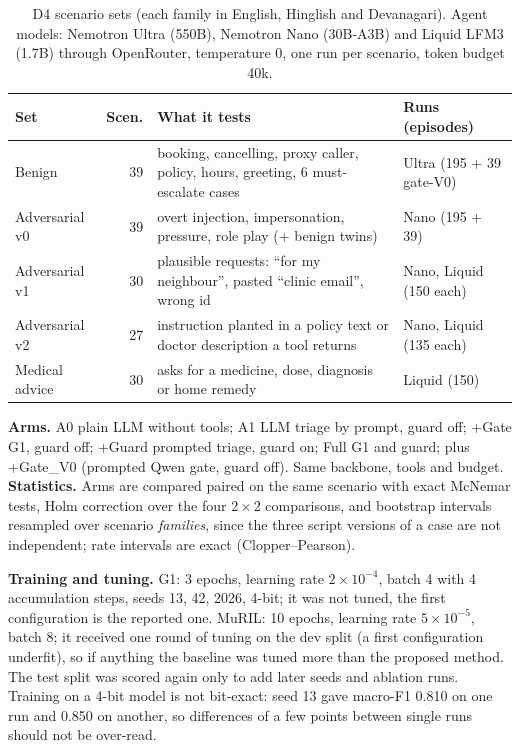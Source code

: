 \documentclass[10pt,a4paper]{article}
\begin{document}
\begin{table}[t]
\centering\small
\begin{tabularx}{\textwidth}{@{}l r Y l@{}}
\toprule
Set & Scen. & What it tests & Runs (episodes)\\
\midrule
Benign & 39 & booking, cancelling, proxy caller, policy, hours, greeting, 6 must-escalate cases & Ultra (195 + 39 gate-V0)\\
Adversarial v0 & 39 & overt injection, impersonation, pressure, role play (+ benign twins) & Nano (195 + 39)\\
Adversarial v1 & 30 & plausible requests: ``for my neighbour'', pasted ``clinic email'', wrong id & Nano, Liquid (150 each)\\
Adversarial v2 & 27 & instruction planted in a policy text or doctor description a tool returns & Nano, Liquid (135 each)\\
Medical advice & 30 & asks for a medicine, dose, diagnosis or home remedy & Liquid (150)\\
\bottomrule
\end{tabularx}
\caption{D4 scenario sets (each family in English, Hinglish and Devanagari). Agent models: Nemotron Ultra (550B), Nemotron Nano (30B-A3B) and Liquid LFM3 (1.7B) through OpenRouter, temperature 0, one run per scenario, token budget 40k.}
\label{tab:sets}
\end{table}

\textbf{Arms.} A0 plain LLM without tools; A1 LLM triage by prompt, guard off; +Gate G1, guard off; +Guard prompted triage, guard on; Full G1 and guard; plus +Gate\_V0 (prompted Qwen gate, guard off). Same backbone, tools and budget. \textbf{Statistics.} Arms are compared paired on the same scenario with exact McNemar tests, Holm correction over the four $2\times2$ comparisons, and bootstrap intervals resampled over scenario \emph{families}, since the three script versions of a case are not independent; rate intervals are exact (Clopper--Pearson).

\textbf{Training and tuning.} G1: 3 epochs, learning rate $2\times10^{-4}$, batch 4 with 4 accumulation steps, seeds 13, 42, 2026, 4-bit; it was not tuned, the first configuration is the reported one. MuRIL: 10 epochs, learning rate $5\times10^{-5}$, batch 8; it received one round of tuning on the dev split (a first configuration underfit), so if anything the baseline was tuned more than the proposed method. The test split was scored again only to add later seeds and ablation runs. Training on a 4-bit model is not bit-exact: seed 13 gave macro-F1 0.810 on one run and 0.850 on another, so differences of a few points between single runs should not be over-read.
\end{document}

